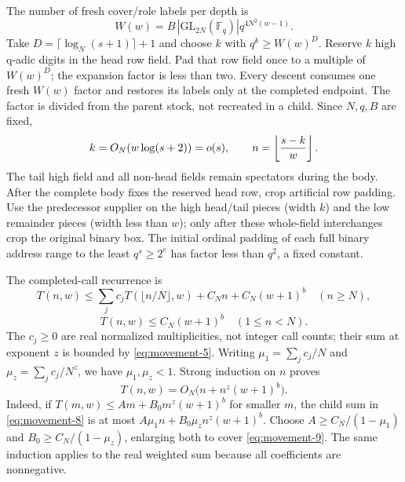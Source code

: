 The number of fresh cover/role labels per depth is
\[
 W(w)=B\,|\mathrm{GL}_{2N}(\mathbb F_q)|q^{4N^2(w-1)}.
\]
Take $D=\lceil\log_N(s+1)\rceil+1$ and choose $k$ with
$q^k\ge W(w)^D$. Reserve $k$ high q-adic digits in the head row field.
Pad that row field once to a multiple of $W(w)^D$; the expansion factor
is less than two. Every descent consumes one fresh $W(w)$ factor and
restores its labels only at the completed endpoint. The factor is divided
from the parent stock, not recreated in a child. Since $N,q,B$ are fixed,
\[
 k=O_N(w\log(s+2))=o(s),\qquad
 n=\left\lfloor {s-k\over w}\right\rfloor.
\]
The tail high field and all non-head fields remain spectators during the
body. After the complete body fixes the reserved head row, crop artificial
row padding. Use the predecessor supplier on the high head/tail pieces
(width $k$) and the low remainder pieces (width less than $w$); only after
these whole-field interchanges crop the original binary box. The initial
ordinal padding of each full binary address range to the least $q^s\ge2^e$
has factor less than $q^2$, a fixed constant.

The completed-call recurrence is
\begin{equation}
 T(n,w)\le \sum_{j}c_j T(\lfloor n/N\rfloor,w)
             +C_Nn+C_N(w+1)^b\quad(n\ge N),       \label{eq:movement-8}
\end{equation}
\begin{equation}
T(n,w)\le C_N(w+1)^b\quad(1\le n<N).             \label{eq:movement-9}
\end{equation}
The $c_j\ge0$ are real normalized multiplicities, not integer call
counts; their sum at exponent $z$ is bounded by \eqref{eq:movement-5}. Writing
$\mu_1=\sum_jc_j/N$ and $\mu_z=\sum_jc_j/N^z$, we have
$\mu_1,\mu_z<1$. Strong induction on $n$ proves
\begin{equation}
 T(n,w)=O_N\bigl(n+n^z(w+1)^b\bigr).               \label{eq:movement-10}
\end{equation}
Indeed, if $T(m,w)\le A m+B_0m^z(w+1)^b$ for smaller $m$, the child
sum in \eqref{eq:movement-8} is at most
$A\mu_1 n+B_0\mu_z n^z(w+1)^b$. Choose
$A\ge C_N/(1-\mu_1)$ and $B_0\ge C_N/(1-\mu_z)$, enlarging both to
cover \eqref{eq:movement-9}. The same induction applies to the real weighted sum because
all coefficients are nonnegative.

